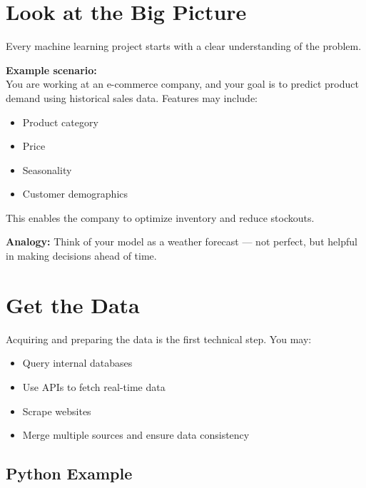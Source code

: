 \documentclass[
  letterpaper,
  DIV=11,
  numbers=noendperiod]{scrreprt}
\providecommand{\tightlist}{%
  \setlength{\itemsep}{0pt}\setlength{\parskip}{0pt}}\usepackage{longtable,booktabs,array}
\begin{document}
\section{Look at the Big Picture}\label{look-at-the-big-picture}

Every machine learning project starts with a clear understanding of the
problem.

\textbf{Example scenario:}\\
You are working at an e-commerce company, and your goal is to predict
product demand using historical sales data. Features may include:

\begin{itemize}
\tightlist
\item
  Product category\\
\item
  Price\\
\item
  Seasonality\\
\item
  Customer demographics
\end{itemize}

This enables the company to optimize inventory and reduce stockouts.

\textbf{Analogy:} Think of your model as a weather forecast --- not
perfect, but helpful in making decisions ahead of time.

\section{Get the Data}\label{get-the-data}

Acquiring and preparing the data is the first technical step. You may:

\begin{itemize}
\tightlist
\item
  Query internal databases\\
\item
  Use APIs to fetch real-time data\\
\item
  Scrape websites\\
\item
  Merge multiple sources and ensure data consistency
\end{itemize}

\subsection{Python Example}\label{python-example}
\end{document}
